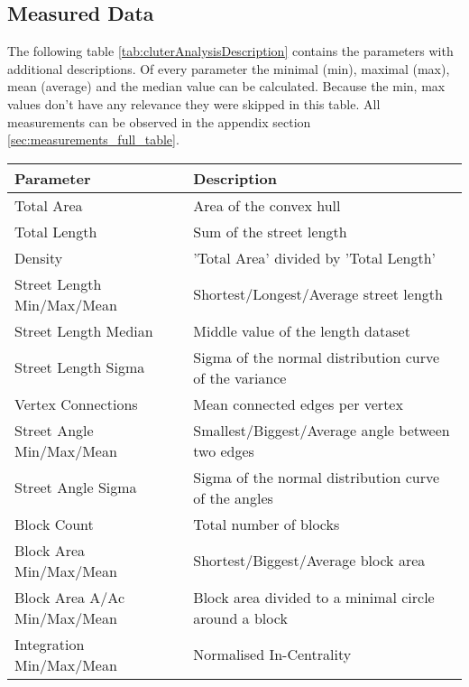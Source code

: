 \FloatBarrier
\subsection{Measured Data}
\label{sec:ClusterAnalysisMeasurements}
The following table \ref{tab:cluterAnalysisDescription} contains the parameters with additional descriptions. Of every parameter the minimal (min), maximal (max), mean (average) and the median value can be calculated. Because the min, max values don't have any relevance they were skipped in this table. All measurements can be observed in the appendix section \ref{sec:measurements_full_table}.

\begin{table}[!ht]
\centering
\begin{tabular}{ | l | l |} \hline
    \textbf{Parameter} & \textbf{Description} \\
    \hline

    Total Area &  Area of the convex hull \\
    Total Length & Sum of the street length \\
    Density & 'Total Area' divided by 'Total Length' \\
    \hline

    Street Length Min/Max/Mean & Shortest/Longest/Average street length  \\
    Street Length Median & Middle value of the length dataset \\
    Street Length Sigma & Sigma of the normal distribution curve of the variance \\
    \hline

    Vertex Connections & Mean connected edges per vertex  \\
    \hline

    Street Angle Min/Max/Mean & Smallest/Biggest/Average angle between two edges \\
    Street Angle Sigma & Sigma of the normal distribution curve of the angles \\
    \hline

    Block Count & Total number of blocks \\
    Block Area Min/Max/Mean & Shortest/Biggest/Average block area \\
    Block Area A/Ac Min/Max/Mean & Block area divided to a minimal circle around a block \\
    \hline

    Integration Min/Max/Mean & Normalised In-Centrality \\
    \hline


\end{tabular}
\end{table}
